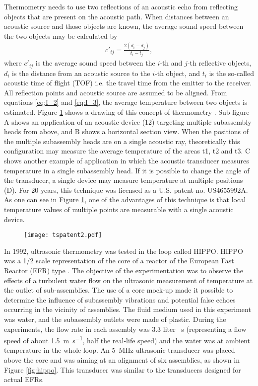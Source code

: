     Thermometry needs to use two reflections of an acoustic echo from reflecting objects that are present on the acoustic path. When distances between an
acoustic source and those objects are known, the average sound speed between the two objects may be calculated by
    \begin{align}\label{eq:I_3}
        c'_{ij}=\frac{2(d_i-d_j)}{t_i-t_j},
    \end{align}
    where $c'_{ij}$ is the average sound speed between the $i$-th and $j$-th reflective objects, $d_i$ is the distance from an acoustic source to the $i$-th object, and
$t_i$ is the so-called acoustic time of flight (TOF) i.e. the travel time from the emitter to the receiver. All reflection points and acoustic source are assumed to
be aligned. From equations \ref{eq:I_2} and \ref{eq:I_3}, the average temperature between two objects is estimated. Figure \ref{fig:tspatent} shows a drawing
of this concept of thermometry \parencite{McKnight1987Remotetemperaturemeasurement}.
Sub-figure A shows an application of an acoustic device (12) targeting multiple subassembly heads from above, and B shows a horizontal section view.
When the positions of the multiple subassembly heads are on a single acoustic ray, theoretically this configuration may measure the average temperature of the areas t1, t2 and t3.
C shows another example of application in which the acoustic transducer measures temperature in a single subassembly head.
If it is possible to change the angle of the transducer, a single device may measure temperature at multiple positions (D).
For 20 years, this technique was licensed as a U.S. patent no. US4655992A.
As one can see in Figure \ref{fig:tspatent}, one of the advantages of this technique is that local temperature values of multiple points
are measurable with a single acoustic device.
    \begin{figure}[htbp]
        \centerline{\texttt{[image: tspatent2.pdf]}}
        \label{fig:tspatent}
    \end{figure}

    In 1992, ultrasonic thermometry was tested in the loop called HIPPO. HIPPO was a 1/2 scale representation of the core of a reactor of the European Fast Reactor (EFR) type
\parencite{Taylor1992Subassemblyoutlettemperature}. The objective of the experimentation was to observe the effects of a turbulent water flow on the
ultrasonic measurement of temperature at the outlet of sub-assemblies. The use of a core mock-up made it possible to determine the influence of subassembly
vibrations and potential false echoes occurring in the vicinity of assemblies. The fluid medium used in this experiment was water, and the subassembly outlets
were made of plastic. During the experiments, the flow rate in each assembly was 3.3 liter \si{\per\second}
(representing a flow speed of about \SI{1.5}{\meter\per\second}, half the real-life speed) and the water was at ambient
temperature in the whole loop. An \SI{5}{\mega\hertz} ultrasonic transducer was placed above the core and was aiming at an alignment of six
assemblies, as shown in Figure \ref{fig:hippo}. This transducer was similar to the transducers designed for actual EFRs.

